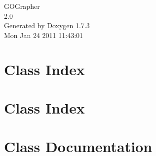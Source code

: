 \documentclass[a4paper]{book}
\begin{document}
\hypersetup{pageanchor=false}
\begin{titlepage}
\vspace*{7cm}
\begin{center}
{\Large GOGrapher \\[1ex]\large 2.0 }\\
\vspace*{1cm}
{\large Generated by Doxygen 1.7.3}\\
\vspace*{0.5cm}
{\small Mon Jan 24 2011 11:43:01}\\
\end{center}
\end{titlepage}
\clearemptydoublepage
{}
\tableofcontents
\clearemptydoublepage
{}
\hypersetup{pageanchor=true}
\chapter{Class Index}

\chapter{Class Index}

\chapter{Class Documentation}










\printindex
\end{document}

